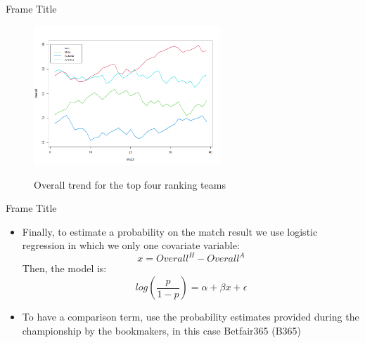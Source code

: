 \documentclass[aspectratio=169,xcolor=dvipsnames]{beamer}
\begin{document}

\begin{frame}{Frame Title}
    \begin{figure}[ht] 
        \begin{center} 
            \includegraphics[width=7cm]{Rplot7.png}\\
         \caption{Overall trend for the top four ranking teams}
        \end{center}
    \end{figure}
\end{frame}


\begin{frame}{Frame Title}
    \begin{itemize}
    
        \item Finally, to estimate a probability on the match result we use logistic regression in which we only one covariate variable:
        \begin{equation*}
            x = Overall^{H} - Overall^A
        \end{equation*}
        Then, the model is:
        \begin{equation*}
            log(\frac{p}{1-p}) = \alpha + \beta x + \epsilon
        \end{equation*}
    
        \item To have a comparison term, use the probability estimates provided during the championship by the bookmakers, in this case Betfair365 (B365)
    \end{itemize}
\end{frame}

\end{document}
